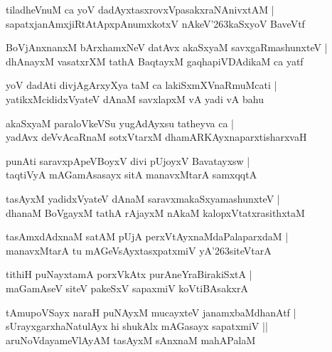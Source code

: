 \documentclass[twoside,12pt,openright]{book}
\def\S{\char'263}
\newcounter{shloka}[chapter]
\begin{document}
\begin{shloka}%
tiladheVnuM ca yoV dadAyxtasxrovxVpasakxraNAnivxtAM |\\
sapatxjanAmxjiRtAtApxpAnumxkotxV nAkeV\S kaSxyoV BaveVtf
\end{shloka}

\begin{shloka}%
BoVjAnxnanxM bArxhamxNeV datAvx akaSxyaM savxgaRmashunxteV |\\
dhAnayxM vasatxrXM tathA BaqtayxM gaqhapiVDAdikaM ca yatf
\end{shloka}

\begin{shloka}%
yoV dadAti divjAgArxyXya taM ca lakiSxmXVnaRmuMcati |\\
yatikxMcididxVyateV dAnaM savxlapxM vA yadi vA bahu
\end{shloka}

\begin{shloka}%
akaSxyaM paraloVkeVSu yugAdAyxsu tatheyva ca |\\
yadAvx deVvAcaRnaM sotxVtarxM dhamARKAyxnaparxtisharxvaH 
\end{shloka}

\begin{shloka}%
punAti saravxpApeVBoyxV divi pUjoyxV Bavatayxsw |\\
taqtiVyA mAGamAsasayx sitA manavxMtarA samxqqtA
\end{shloka}

\begin{shloka}%
tasAyxM yadidxVyateV dAnaM saravxmakaSxyamashunxteV |\\
dhanaM BoVgayxM tathA rAjayxM nAkaM kalopxVtatxrasithxtaM 
\end{shloka}

\begin{shloka}%
tasAmxdAdxnaM satAM pUjA perxVtAyxnaMdaPalaparxdaM |\\
manavxMtarA tu mAGeVsAyxtasxpatxmiV yA\S siteVtarA 
\end{shloka}

\begin{shloka}%
tithiH puNayxtamA porxVkAtx purAneYraBirakiSxtA |\\
maGamAseV siteV pakeSxV sapaxmiV koVtiBAsakxrA 
\end{shloka}

\begin{shloka}%
tAmupoVSayx naraH puNAyxM mucayxteV janamxbaMdhanAtf |\\
sUrayxgarxhaNatulAyx hi shukAlx mAGasayx sapatxmiV ||\\
aruNoVdayameVlAyAM tasAyxM sAnxnaM mahAPalaM 
\end{shloka}
\end{document}
